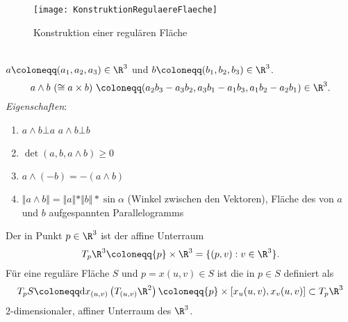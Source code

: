\begin{figure}[H]
  \texttt{[image: KonstruktionRegulaereFlaeche]}
  \caption{Konstruktion einer regulären Fläche}
\end{figure}

\begin{remark}
  \  \\
  \( a \coloneqq (a_1, a_2, a_3) \in \R^3 \) und \( b \coloneqq (b_1, b_2, b_3) \in \R^3 \).
  \begin{equation*}
    a \wedge b \ (\cong a \times b) \ \coloneqq (a_2b_3-a_3b_2, a_3b_1-a_1b_3, a_1b_2-a_2b_1) \in \R^3\text{.}
  \end{equation*}
  \emph{Eigenschaften}:
  \begin{enumerate}
    \item \( a \wedge b \bot a \) \quad \( a \wedge b \bot b \)
    \item \( \det(a, b, a \wedge b) \geq 0 \)
    \item \( a \wedge (-b) = - (a \wedge b) \)
    \item \( \Vert a \wedge b \Vert = \Vert a \Vert * \Vert b \Vert * \sin \alpha \) (Winkel zwischen den Vektoren), Fläche des von \( a \) und \( b \) aufgespannten Parallelogramms
  \end{enumerate}
\end{remark}

\begin{definition}[Tangentialraum]
  Der \label{def:tangentialraum} in Punkt \( p \in \R^3 \) ist der affine Unterraum
  \begin{equation*}
    T_p\R^3 \coloneqq \{ p \} \times \R^3 = \{ (p,v) : v \in \R^3 \}\text{.}
  \end{equation*}
  Für eine reguläre Fläche \( S \) und \( p = x(u,v) \in S \) ist die \label{def:tangentialebene} in \( p \in S \) definiert als
  \begin{equation*}
    T_p S \coloneqq \text{d}x_{(u,v)}\left(T_{(u,v)}\R^2\right) \coloneqq \{ p \} \times [x_u(u,v), x_v(u,v)] \subset T_p\R^3
  \end{equation*}
  \( 2 \)-dimensionaler, affiner Unterraum des \( \R^3 \).
\end{definition}


